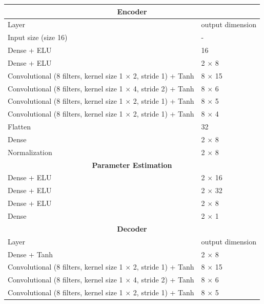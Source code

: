 \begin{table}
	\begin{adjustbox}{width=0.85\columnwidth,center}
	\begin{tabular}{|l|l|} 
		\hline
		\multicolumn{2}{|c|}{\textbf{Encoder}} 															\\
		\hline
		Layer 																	&	output dimension	\\
		\hline
		Input size (size 16)      												&	-    	 		    \\ 
		Dense + ELU          													&	16					\\
		Dense + ELU   															&	2 $\times$ 8		\\
		Convolutional (8 filters, kernel size 1 $\times$ 2, stride 1) + Tanh 	&   8 $\times$ 15		\\
		Convolutional (8 filters, kernel size 1 $\times$ 4, stride 2) + Tanh 	&   8 $\times$ 6		\\
		Convolutional (8 filters, kernel size 1 $\times$ 2, stride 1) + Tanh 	&   8 $\times$ 5		\\
		Convolutional (8 filters, kernel size 1 $\times$ 2, stride 1) + Tanh 	&   8 $\times$ 4		\\
		Flatten															 		&   32					\\
		Dense																	&	2 $\times$ 8		\\
		Normalization															&	2 $\times$ 8		\\
		\hline   
		\hline												
		\multicolumn{2}{|c|}{\textbf{Parameter Estimation}} 											\\
		\hline
		Dense + ELU																&	2 $\times$ 16		\\
		\hline
		Dense + ELU																&	2 $\times$ 32		\\
		\hline
		Dense + ELU																&	2 $\times$ 8		\\
		\hline
		Dense																	&	2 $\times$	1		\\
		\hline
		\hline
		\multicolumn{2}{|c|}{\textbf{Decoder}}															\\
		\hline
		Layer 																	&	output dimension	\\
		\hline
		Dense + Tanh          													&	2 $\times$ 8		\\
		Convolutional (8 filters, kernel size 1 $\times$ 2, stride 1) + Tanh 	&   8 $\times$ 15		\\
		Convolutional (8 filters, kernel size 1 $\times$ 4, stride 2) + Tanh 	&   8 $\times$ 6		\\
		Convolutional (8 filters, kernel size 1 $\times$ 2, stride 1) + Tanh 	&   8 $\times$ 5		\\

\end{tabular}
\end{adjustbox}
\end{table}
